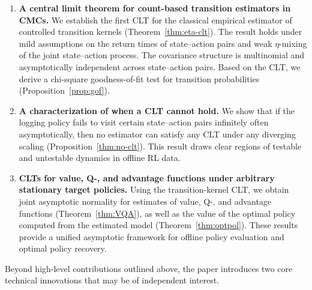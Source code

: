 \documentclass[twoside,11pt]{article}
\numberwithin{equation}{section}
\begin{document}
\begin{enumerate}
    \item \textbf{A central limit theorem for count-based transition estimators in CMCs.} We establish the first CLT for the classical empirical estimator of controlled transition kernels (Theorem~\ref{thm:eta-clt}). The result holds under mild assumptions on the return times of state–action pairs and weak $\eta$-mixing of the joint state–action process. 
    The covariance structure is multinomial and asymptotically independent across state–action pairs. 
    Based on the CLT, we derive a chi-square goodness-of-fit test for transition probabilities (Proposition~\ref{prop:gof}).
    \item \textbf{A characterization of when a CLT cannot hold.} We show that if the logging policy fails to visit certain state–action pairs infinitely often asymptotically, then no estimator can satisfy any CLT under any diverging scaling (Proposition~\ref{thm:no-clt}). This result draws clear regions of testable and untestable dynamics in offline RL data.
    \item \textbf{CLTs for value, Q-, and advantage functions under arbitrary stationary target policies.} Using the transition-kernel CLT, we obtain joint asymptotic normality for estimates of value, Q-, and advantage functions (Theorem~\ref{thm:VQA}), as well as the value of the optimal policy computed from the estimated model (Theorem~\ref{thm:optpol}). 
    These results provide a unified asymptotic framework for offline policy evaluation and optimal policy recovery.
\end{enumerate}
Beyond high-level contributions outlined above, the paper introduces two core technical innovations that may be of independent interest.
\end{document}
